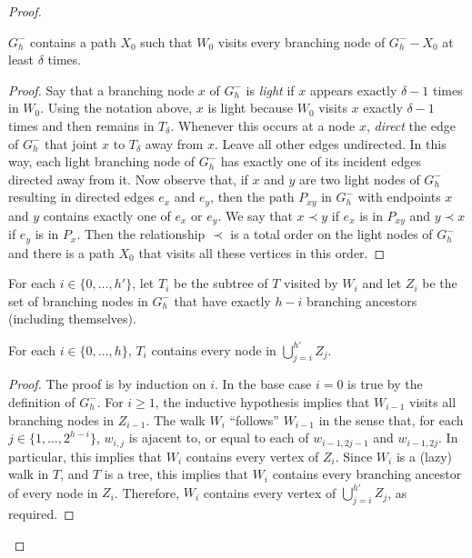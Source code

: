 \documentclass{patmorin}
\newcommand{\defin}[1]{\emph{\color{brightmaroon}#1}}
\begin{document}
\begin{proof}
  \begin{clm}
    $G_h^-$ contains a path $X_0$ such that $W_0$ visits every branching node of $G_h^--X_0$ at least $\delta$ times.
  \end{clm}

  \begin{proof}
    Say that a branching node $x$ of $G_h^-$ is \defin{light} if $x$ appears exactly $\delta-1$ times in $W_0$. Using the notation above, $x$ is light because $W_0$ visits $x$ exactly $\delta-1$ times and then remains in $T_\delta$.  Whenever this occurs at a node $x$, \defin{direct} the edge of $G_h^-$ that joint $x$ to $T_\delta$ away from $x$. Leave all other edges undirected.  In this way, each light branching node of $G_h^-$ has exactly one of its incident edges directed away from it.  Now observe that, if $x$ and $y$ are two light nodes of $G_h^-$ resulting in directed edges $e_x$ and $e_y$, then the path $P_{xy}$ in $G_h^-$ with endpoints $x$ and $y$ contains exactly one of $e_x$ or $e_y$.  We say that $x\prec y$ if $e_x$ is in $P_{xy}$ and $y\prec x$ if $e_y$ is in $P_x$.  Then the relationship $\prec$ is a total order on the light nodes of $G_h^-$ and there is a path $X_0$ that visits all these vertices in this order.
  \end{proof}


  For each $i\in\{0,\ldots,h'\}$, let $T_i$ be the subtree of $T$ visited by $W_i$ and let $Z_i$ be the set of branching nodes in $G_h^-$ that have exactly $h-i$ branching ancestors (including themselves).

  \begin{clm}
    For each $i\in\{0,\ldots,h\}$, $T_i$ contains every node in $\bigcup_{j=i}^{h'}Z_j$.
  \end{clm}

  \begin{proof}
    The proof is by induction on $i$. In the base case $i=0$ is true by the definition of $G_h^-$.  For $i\ge 1$, the inductive hypothesis implies that $W_{i-1}$ visits all branching nodes in $Z_{i-1}$. The walk $W_{i}$ ``follows'' $W_{i-1}$ in the sense that, for each $j\in\{1,\ldots,2^{h-i}\}$, $w_{i,j}$ is ajacent to, or equal to each of $w_{i-1,2j-1}$ and $w_{i-1,2j}$.  In particular, this implies that $W_i$ contains every vertex of $Z_i$. Since $W_i$ is a (lazy) walk in $T$, and $T$ is a tree, this implies that $W_i$ contains every branching ancestor of every node in $Z_i$.  Therefore, $W_i$ contains every vertex of $\bigcup_{j=i}^{h'} Z_j$, as required.
  \end{proof}


\end{proof}
\end{document}
